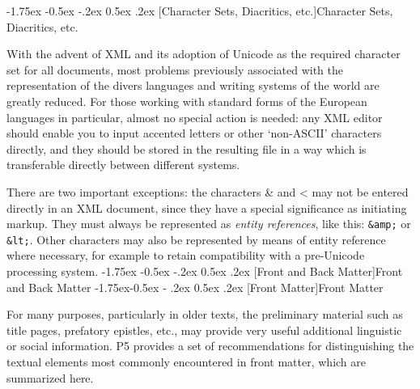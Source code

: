 \documentclass[11pt,twoside]{article}\makeatletter
\makeatletter
\renewcommand\section{\@startsection {section}{1}{\z@}%
     {-1.75ex \@plus -0.5ex \@minus -.2ex}%
     {0.5ex \@plus .2ex}%
     {\reset@font\Large\bfseries\sffamily}}
\renewcommand\subsection{\@startsection{subsection}{2}{\z@}%
     {-1.75ex\@plus -0.5ex \@minus- .2ex}%
     {0.5ex \@plus .2ex}%
     {\reset@font\Large\sffamily}}
\makeatother
\begin{document}
\section[{Character Sets, Diacritics, etc.}]{Character Sets, Diacritics, etc.}\label{U5-chars}\par
With the advent of XML and its adoption of Unicode as the required character set for all documents, most problems previously associated with the representation of the divers languages and writing systems of the world are greatly reduced. For those working with standard forms of the European languages in particular, almost no special action is needed: any XML editor should enable you to input accented letters or other ‘non-ASCII’ characters directly, and they should be stored in the resulting file in a way which is transferable directly between different systems.\par
There are two important exceptions: the characters \& and < may not be entered directly in an XML document, since they have a special significance as initiating markup. They must always be represented as \textit{entity references}, like this: \texttt{\&amp;} or \texttt{\&lt;}. Other characters may also be represented by means of entity reference where necessary, for example to retain compatibility with a pre-Unicode processing system.
\section[{Front and Back Matter}]{Front and Back Matter}\label{U5-fronbac}
\subsection[{Front Matter}]{Front Matter}\par
For many purposes, particularly in older texts, the preliminary material such as title pages, prefatory epistles, etc., may provide very useful additional linguistic or social information. P5 provides a set of recommendations for distinguishing the textual elements most commonly encountered in front matter, which are summarized here.
\end{document}
